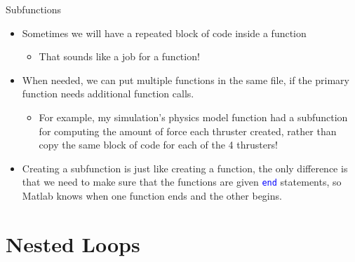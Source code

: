 {}\documentclass[letterpaper,
compress,
xcolor=x11names,
]{beamer}
\begin{document}
\begin{frame}{Subfunctions}
	\footnotesize
	\begin{itemize}
		\item Sometimes we will have a repeated block of code inside a function
		\begin{itemize}
			\item That sounds like a job for a function!
		\end{itemize}
		\item<2-> When needed, we can put multiple functions in the same file, if the primary function needs additional function calls.
		\begin{itemize}
			\item For example, my simulation's physics model function had a subfunction for computing the amount of force each thruster created, rather than copy the same block of code for each of the 4 thrusters!
		\end{itemize}
		\item<3-> Creating a subfunction is just like creating a function, the only difference is that we need to make sure that the functions are given \textcolor{blue}{\texttt{end}} statements, so Matlab knows when one function ends and the other begins.
	\end{itemize}

\end{frame}

\section{Nested Loops}
\end{document}
